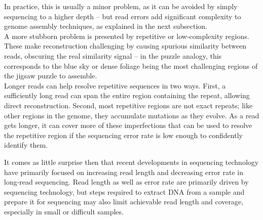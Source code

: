 In practice, this is usually a minor problem, as it can be avoided by simply sequencing to a higher depth -- but read errors add significant complexity to genome assembly techniques, as explained in the next subsection.\\
A more stubborn problem is presented by repetitive or low-complexity regions.
These make reconstruction challenging by causing spurious similarity between reads, obscuring the real similarity signal -- in the puzzle analogy, this corresponds to the blue sky or dense foliage being the most challenging regions of the jigsaw puzzle to assemble.\\
Longer reads can help resolve repetitive sequences in two ways.
First, a sufficiently long read can span the entire region containing the repeat, allowing direct reconstruction.
Second, most repetitive regions are not exact repeats; like other regions in the genome, they accumulate mutations as they evolve.
As a read gets longer, it can cover more of these imperfections that can be used to resolve the repetitive region if the sequencing error rate is low enough to confidently identify them. %

It comes as little surprise then that recent developments in sequencing technology have primarily focused on increasing read length and decreasing error rate in long-read sequencing.
Read length as well as error rate are primarily driven by sequencing technology, but steps required to extract DNA from a sample and prepare it for sequencing may also limit achievable read length and coverage, especially in small or difficult samples\cite{ebpseqrecs, lu24}.

